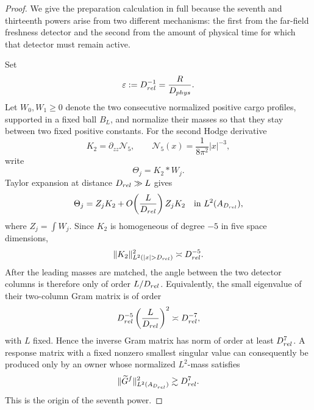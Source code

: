 \documentclass[10pt,a4paper]{amsart}
\begin{document}
\begin{proof}
We give the preparation calculation in full because the seventh and thirteenth
powers arise from two different mechanisms: the first from the far-field
freshness detector and the second from the amount of physical time for which
that detector must remain active.

Set
\[
 \varepsilon:=D_{\rm rel}^{-1}=\frac{R}{D_{\rm phys}}.
\]
Let $W_0,W_1\ge0$ denote the two consecutive normalized positive cargo profiles,
supported in a fixed ball $B_L$, and normalize their masses so that they stay
between two fixed positive constants.  For the second Hodge derivative
\[
 K_2=\partial_{zz}\mathcal N_5,
 \qquad \mathcal N_5(x)=\frac1{8\pi^2}|x|^{-3},
\]
write
\[
 \Theta_j=K_2*W_j.
\]
Taylor expansion at distance $D_{\rm rel}\gg L$ gives
\[
 \Theta_j=Z_jK_2+O\!\left(\frac{L}{D_{\rm rel}}\right)Z_jK_2
 \quad\hbox{in }L^2(A_{D_{\rm rel}}),
\]
where $Z_j=\int W_j$.  Since $K_2$ is homogeneous of degree $-5$ in five
space dimensions,
\[
 \|K_2\|_{L^2(|x|>D_{\rm rel})}^2\asymp D_{\rm rel}^{-5}.
\]
After the leading masses are matched, the angle between the two detector
columns is therefore only of order $L/D_{\rm rel}$.  Equivalently, the small
eigenvalue of their two-column Gram matrix is of order
\[
 D_{\rm rel}^{-5}
 \left(\frac{L}{D_{\rm rel}}\right)^2
 \asymp D_{\rm rel}^{-7},
\]
with $L$ fixed.  Hence the inverse Gram matrix has norm of order at least
$D_{\rm rel}^{7}$.  A response matrix with a fixed nonzero smallest singular
value can consequently be produced only by an owner whose normalized
$L^2$-mass satisfies
\[
 \|\widetilde G^f\|_{L^2(A_{D_{\rm rel}})}^2
 \gtrsim D_{\rm rel}^{7}.
\]
This is the origin of the seventh power.


\end{proof}
\end{document}
